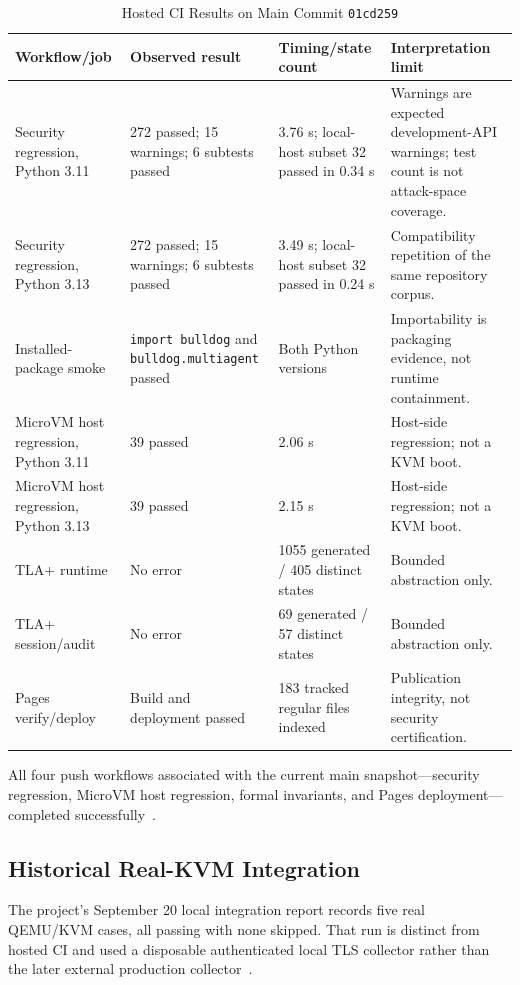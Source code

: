 \documentclass[journal]{IEEEtran}
\newcommand{\mainshort}{\texttt{01cd259}}
\begin{document}
\begin{table}[!t]
\caption{Hosted CI Results on Main Commit \mainshort}
\label{tab:ci}
\centering
\small
\begin{tabularx}{\textwidth}{lYYY}
\toprule
\textbf{Workflow/job} & \textbf{Observed result} & \textbf{Timing/state count} & \textbf{Interpretation limit} \\
\midrule
Security regression, Python 3.11 & 272 passed; 15 warnings; 6 subtests passed & 3.76 s; local-host subset 32 passed in 0.34 s & Warnings are expected development-API warnings; test count is not attack-space coverage. \\
Security regression, Python 3.13 & 272 passed; 15 warnings; 6 subtests passed & 3.49 s; local-host subset 32 passed in 0.24 s & Compatibility repetition of the same repository corpus. \\
Installed-package smoke & \texttt{import bulldog} and \texttt{bulldog.multiagent} passed & Both Python versions & Importability is packaging evidence, not runtime containment. \\
MicroVM host regression, Python 3.11 & 39 passed & 2.06 s & Host-side regression; not a KVM boot. \\
MicroVM host regression, Python 3.13 & 39 passed & 2.15 s & Host-side regression; not a KVM boot. \\
TLA+ runtime & No error & 1055 generated / 405 distinct states & Bounded abstraction only. \\
TLA+ session/audit & No error & 69 generated / 57 distinct states & Bounded abstraction only. \\
Pages verify/deploy & Build and deployment passed & 183 tracked regular files indexed & Publication integrity, not security certification. \\
\bottomrule
\end{tabularx}
\end{table}

All four push workflows associated with the current main snapshot---security regression, MicroVM host regression, formal invariants, and Pages deployment---completed successfully~\cite{BULL_CI_Security,BULL_CI_MicroVM,BULL_CI_Formal,BULL_CI_Pages}.

\subsection{Historical Real-KVM Integration}
The project's September 20 local integration report records five real QEMU/KVM cases, all passing with none skipped. That run is distinct from hosted CI and used a disposable authenticated local TLS collector rather than the later external production collector~\cite{BULL_MicroVMReport}.
\end{document}
